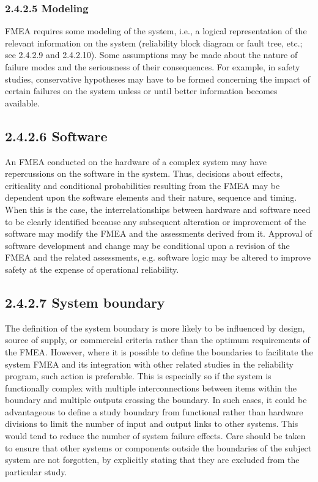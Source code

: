 \documentclass[./dissertation.tex]{subfiles}
\begin{document}
\subsubsection{2.4.2.5 Modeling}

FMEA requires some modeling of the system, i.e., a logical representation of the relevant information on the system (reliability block diagram or fault tree, etc.; see 2.4.2.9 and 2.4.2.10). Some assumptions may be made about the nature of failure modes and the seriousness of their consequences. For example, in safety studies, conservative hypotheses may have to be formed concerning the impact of certain failures on the system unless or until better information becomes available.

\subsection{2.4.2.6 Software}

An FMEA conducted on the hardware of a complex system may have repercussions on the software in the system. Thus, decisions about effects, criticality and conditional probabilities resulting from the FMEA may be dependent upon the software elements and their nature, sequence and timing. When this is the case, the interrelationships between hardware and software need to be clearly identified because any subsequent alteration or improvement of the software may modify the FMEA and the assessments derived from it. Approval of software development and change may be conditional upon a revision of the FMEA and the related assessments, e.g. software logic may be altered to improve safety at the expense of operational reliability.

\subsection{2.4.2.7 System boundary}

The definition of the system boundary is more likely to be influenced by design, source of supply, or commercial criteria rather than the optimum requirements of the FMEA. However, where it is possible to define the boundaries to facilitate the system FMEA and its integration with other related studies in the reliability program, such action is preferable. This is especially so if the system is functionally complex with multiple interconnections between items within the boundary and multiple outputs crossing the boundary. In such cases, it could be advantageous to define a study boundary from functional rather than hardware divisions to limit the number of input and output links to other systems. This would tend to reduce the number of system failure effects. Care should be taken to ensure that other systems or components outside the boundaries of the subject system are not forgotten, by explicitly stating that they are excluded from the particular study.
\end{document}
